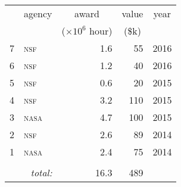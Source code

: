 \begin{tabular}{rlrrr}

\toprule & \multicolumn{1}{c}{agency} & \multicolumn{1}{c}{award}  & \multicolumn{1}{c}{value} & \multicolumn{1}{c}{year} \\ 
&  & \multicolumn{1}{c}{($\times10^6$ hour)} & \multicolumn{1}{c}{(\$k)} &  \\ \midrule

7  &  \textsc{\MakeTextLowercase{NSF}}  &  1.6  &  55  &  2016\\

6  &  \textsc{\MakeTextLowercase{NSF}}  &  1.2  &  40  &  2016\\

5  &  \textsc{\MakeTextLowercase{NSF}}  &  0.6  &  20  &  2015\\

4  &  \textsc{\MakeTextLowercase{NSF}}  &  3.2  &  110  &  2015\\

3  &  \textsc{\MakeTextLowercase{NASA}}  &  4.7  &  100  &  2015\\

2  &  \textsc{\MakeTextLowercase{NSF}}  &  2.6  &  89  &  2014\\

1  &  \textsc{\MakeTextLowercase{NASA}}  &  2.4  &  75  &  2014\\

\\[-0.5ex] \multicolumn{2}{r}{\textit{total:}} & 16.3  & 489 & \\\bottomrule\end{tabular}
